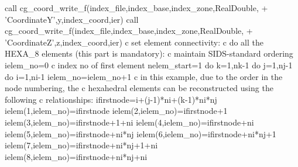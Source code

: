 \documentclass[12pt]{article}
\begin{document}
{\newline\indent      call cg\_coord\_write\_f(index\_file,index\_base,index\_zone,RealDouble,
\newline + \indent 'CoordinateY',y,index\_coord,ier)
\newline\indent      call cg\_coord\_write\_f(index\_file,index\_base,index\_zone,RealDouble,
\newline + \indent 'CoordinateZ',z,index\_coord,ier)
\newline c  set element connectivity:
\newline c  do all the HEXA\_8 elements (this part is mandatory):
\newline c  maintain SIDS-standard ordering
\newline\indent   ielem\_no=0
\newline c  index no of first element
\newline\indent      nelem\_start=1
\newline\indent   do k=1,nk-1
\newline\indent\indent   do j=1,nj-1
\newline\indent\indent\indent   do i=1,ni-1
\newline\indent\indent\indent\indent     ielem\_no=ielem\_no+1
\newline c  in this example, due to the order in the node numbering, the
\newline c  hexahedral elements can be reconstructed using the following
\newline c  relationships:
\newline\indent\indent\indent\indent     ifirstnode=i+(j-1)*ni+(k-1)*ni*nj
\newline\indent\indent\indent\indent     ielem(1,ielem\_no)=ifirstnode
\newline\indent\indent\indent\indent     ielem(2,ielem\_no)=ifirstnode+1
\newline\indent\indent\indent\indent     ielem(3,ielem\_no)=ifirstnode+1+ni
\newline\indent\indent\indent\indent     ielem(4,ielem\_no)=ifirstnode+ni
\newline\indent\indent\indent\indent     ielem(5,ielem\_no)=ifirstnode+ni*nj
\newline\indent\indent\indent\indent     ielem(6,ielem\_no)=ifirstnode+ni*nj+1
\newline\indent\indent\indent\indent     ielem(7,ielem\_no)=ifirstnode+ni*nj+1+ni
\newline\indent\indent\indent\indent     ielem(8,ielem\_no)=ifirstnode+ni*nj+ni
}
\end{document}
